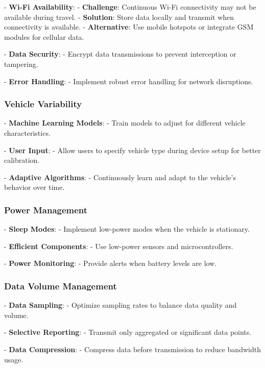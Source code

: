 \documentclass[12pt,a4paper]{article}
\begin{document}
- \textbf{Wi-Fi Availability}:
  - \textbf{Challenge}: Continuous Wi-Fi connectivity may not be available during travel.
  - \textbf{Solution}: Store data locally and transmit when connectivity is available.
  - \textbf{Alternative}: Use mobile hotspots or integrate GSM modules for cellular data.

- \textbf{Data Security}:
  - Encrypt data transmissions to prevent interception or tampering.

- \textbf{Error Handling}:
  - Implement robust error handling for network disruptions.

\subsubsection*{Vehicle Variability}

- \textbf{Machine Learning Models}:
  - Train models to adjust for different vehicle characteristics.

- \textbf{User Input}:
  - Allow users to specify vehicle type during device setup for better calibration.

- \textbf{Adaptive Algorithms}:
  - Continuously learn and adapt to the vehicle's behavior over time.

\subsubsection*{Power Management}

- \textbf{Sleep Modes}:
  - Implement low-power modes when the vehicle is stationary.

- \textbf{Efficient Components}:
  - Use low-power sensors and microcontrollers.

- \textbf{Power Monitoring}:
  - Provide alerts when battery levels are low.

\subsubsection*{Data Volume Management}

- \textbf{Data Sampling}:
  - Optimize sampling rates to balance data quality and volume.

- \textbf{Selective Reporting}:
  - Transmit only aggregated or significant data points.

- \textbf{Data Compression}:
  - Compress data before transmission to reduce bandwidth usage.
\end{document}
